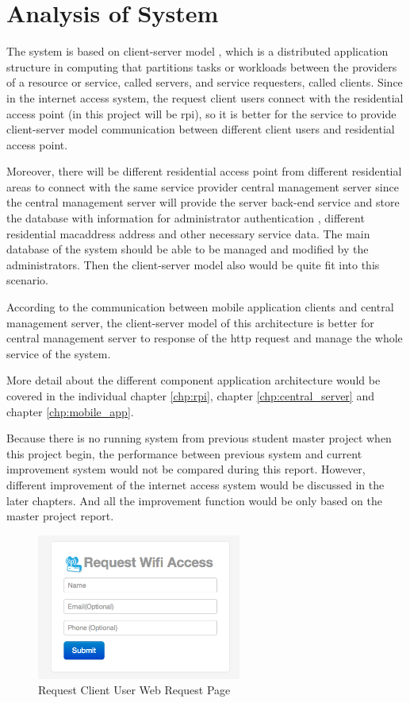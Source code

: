 \section{Analysis of System}
\par The system is based on client-server model \cite{csmodel}, which is a distributed application structure in computing that partitions tasks or workloads between the providers of a resource or service, called servers, and service requesters, called clients. Since in the internet access system, the request client users connect with the residential access point (in this project will be \gls{rpi}), so it is better for the service to provide client-server model communication between different client users and residential access point. \par Moreover, there will be different residential access point from different residential areas to connect with the same service provider central management server since the central management server will provide the server back-end service and store the database with information for administrator authentication , different residential \gls{macaddress} address and other necessary service data. The main database of the system should be able to be managed and modified by the administrators. Then the client-server model also would be quite fit into this scenario.
\par According to the communication between mobile application clients and central management server, the client-server model of this architecture is better for central management server to response of the \gls{http} request and manage the whole service of the system.
\par More detail about the different component application architecture would be covered in the individual chapter \ref{chp:rpi}, chapter \ref{chp:central_server} and chapter \ref{chp:mobile_app}.
\par Because there is no running system from previous student master project when this project begin, the performance between previous system and current improvement system would not be compared during this report. However, different improvement of the internet access system would be discussed in the later chapters. And all the improvement function would be only based on the master project report\cite{TorgeirMR}.

\begin{figure}
	\centering
    	\includegraphics[width=0.60\textwidth,natwidth=610,natheight=642]{figs/wifi_request_page.png}
  	\caption{Request Client User Web Request Page}
  	\label{fig:wifi_request_page}
\end{figure}

